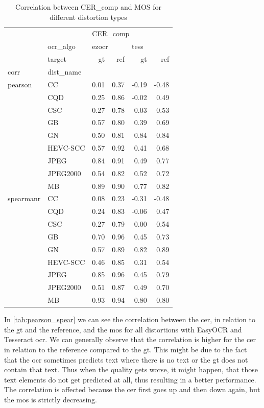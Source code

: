 \begin{table}[h]
\centering
\begin{tabular}{llrrrr}
\toprule
          & {} & \multicolumn{4}{l}{CER\_comp} \\
          & ocr\_algo & \multicolumn{2}{l}{ezocr} & \multicolumn{2}{l}{tess} \\
          & target &       gt &   ref &    gt &   ref \\
corr & dist\_name &          &       &       &       \\
\midrule
pearson & CC &     0.01 &  0.37 & -0.19 & -0.48 \\
          & CQD &     0.25 &  0.86 & -0.02 &  0.49 \\
          & CSC &     0.27 &  0.78 &  0.03 &  0.53 \\
          & GB &     0.57 &  0.80 &  0.39 &  0.69 \\
          & GN &     0.50 &  0.81 &  0.84 &  0.84 \\
          & HEVC-SCC &     0.57 &  0.92 &  0.41 &  0.68 \\
          & JPEG &     0.84 &  0.91 &  0.49 &  0.77 \\
          & JPEG2000 &     0.54 &  0.82 &  0.52 &  0.72 \\
          & MB &     0.89 &  0.90 &  0.77 &  0.82 \\
spearmanr & CC &     0.08 &  0.23 & -0.31 & -0.48 \\
          & CQD &     0.24 &  0.83 & -0.06 &  0.47 \\
          & CSC &     0.27 &  0.79 &  0.00 &  0.54 \\
          & GB &     0.70 &  0.96 &  0.45 &  0.73 \\
          & GN &     0.57 &  0.89 &  0.82 &  0.89 \\
          & HEVC-SCC &     0.46 &  0.85 &  0.31 &  0.54 \\
          & JPEG &     0.85 &  0.96 &  0.45 &  0.79 \\
          & JPEG2000 &     0.51 &  0.87 &  0.49 &  0.70 \\
          & MB &     0.93 &  0.94 &  0.80 &  0.80 \\
\bottomrule
\end{tabular}
\caption{Correlation between CER\_comp and MOS for different distortion types}
\label{tab:pearson_spear}
\end{table}

In \autoref{tab:pearson_spear} we can see the correlation between the \gls{cer}, in relation to the \gls{gt} and the reference, and the \gls{mos} for all distortions with EasyOCR and Tesseract \gls{ocr}.
We can generally observe that the correlation is higher for the \gls{cer} in relation to the reference compared to the \gls{gt}.
This might be due to the fact that the \gls{ocr} sometimes predicts text where there is no text or the \gls{gt} does not contain that text.
Thus when the quality gets worse, it might happen, that those text elements do not get predicted at all, thus resulting in a better performance.
The correlation is affected because the \gls{cer} first goes up and then down again, but the \gls{mos} is strictly decreasing.

